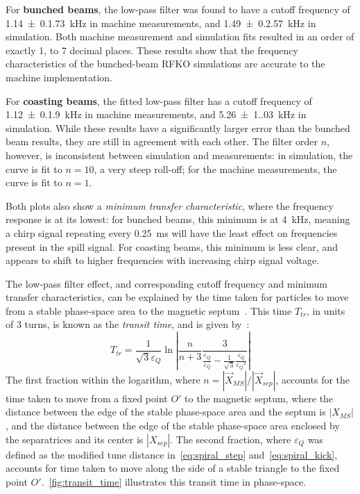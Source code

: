 \documentclass[a4paper,twoside,11pt]{report}
\begin{document}
For \textbf{bunched beams}, the low-pass filter was found to have a cutoff frequency of \qty[separate-uncertainty = true]{1.14(0.173)}{\kilo\hertz} in machine measurements, and \qty[separate-uncertainty = true]{1.49(0.257)}{\kilo\hertz} in simulation. Both machine measurement and simulation fits resulted in an order of exactly 1, to 7 decimal places. These results show that the frequency characteristics of the bunched-beam RFKO simulations are accurate to the machine implementation.

For \textbf{coasting beams}, the fitted low-pass filter has a cutoff frequency of \qty[separate-uncertainty = true]{1.12(0.190)}{\kilo\hertz} in machine measurements, and \qty[separate-uncertainty = true]{5.26(1.03)}{\kilo\hertz} in simulation. While these results have a significantly larger error than the bunched beam results, they are still in agreement with each other. The filter order $n$, however, is inconsistent between simulation and measurements: in simulation, the curve is fit to $n=10$, a very steep roll-off; for the machine measurements, the curve is fit to $n=1$.

Both plots also show a \textit{minimum transfer characteristic}, where the frequency response is at its lowest: for bunched beams, this minimum is at \qty{4}{\kilo\hertz}, meaning a chirp signal repeating every \qty{0.25}{\milli\second} will have the least effect on frequencies present in the spill signal. For coasting beams, this minimum is less clear, and appears to shift to higher frequencies with increasing chirp signal voltage.

The low-pass filter effect, and corresponding cutoff frequency and minimum transfer characteristics, can be explained by the time taken for particles to move from a stable phase-space area to the magnetic septum~\cite{Sorge_2018}. This time $T_{tr}$, in units of 3 turns, is known as the \textit{transit time}, and is given by~\cite{Pullia:313678, Bryant:CAS}:
\begin{equation}
  T_{tr} = \frac 1{\sqrt{3}{\varepsilon_Q}} \ln \left| \frac n{n+3} \frac 3{\frac {\dot {\varepsilon_Q}}{\varepsilon_Q} - \frac 1{\sqrt 3}\frac{\dot{{\varepsilon_Q}}}{{{\varepsilon_Q}}^2}}\right|
  \label{eq:transit_time}
\end{equation} 
The first fraction within the logarithm, where $n=|\vec X_{MS}|/|\vec X_{sep}|$, accounts for the time taken to move from a fixed point $O'$ to the magnetic septum, where the distance between the edge of the stable phase-space area and the septum is $|X_{MS}|$, and the distance between the edge of the stable phase-space area enclosed by the separatrices and its center is $|X_{sep}|$. The second fraction, where ${\varepsilon_Q}$ was defined as the modified tune distance in~\autoref{eq:spiral_step} and~\autoref{eq:spiral_kick}, accounts for time taken to move along the side of a stable triangle to the fixed point $O'$.~\autoref{fig:transit_time} illustrates this transit time in phase-space.
\end{document}
